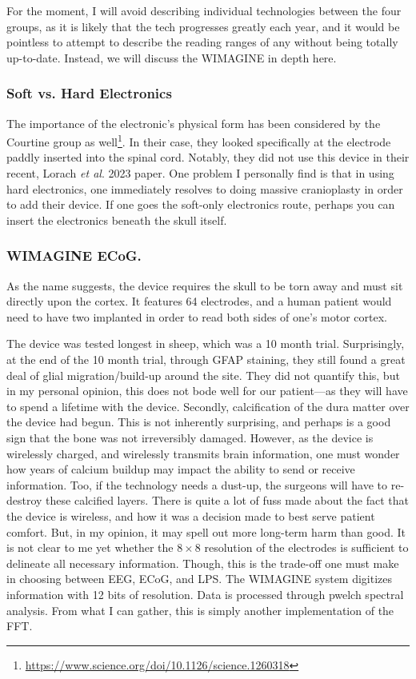 \documentclass[12pt]{report}
\begin{document}
For the moment, I will avoid describing individual technologies between the four groups, as it is likely that the tech progresses greatly each year, and it would be pointless to attempt to describe the reading ranges of any without being totally up-to-date. Instead, we will discuss the WIMAGINE in depth here.

\subsubsection{Soft vs. Hard Electronics}
The importance of the electronic's physical form has been considered by the Courtine group as well\footnote{\url{https://www.science.org/doi/10.1126/science.1260318}}. In their case, they looked specifically at the electrode paddly inserted into the spinal cord. Notably, they did not use this device in their recent, Lorach \textit{et al}. 2023 paper. One problem I personally find is that in using hard electronics, one immediately resolves to doing massive cranioplasty in order to add their device. If one goes the soft-only electronics route, perhaps you can insert the electronics beneath the skull itself. 

\subsubsection{WIMAGINE ECoG.}
As the name suggests, the device requires the skull to be torn away and must sit directly upon the cortex. It features 64 electrodes, and a human patient would need to have two implanted in order to read both sides of one's motor cortex.\newline

The device was tested longest in sheep, which was a 10 month trial. Surprisingly, at the end of the 10 month trial, through GFAP staining, they still found a great deal of glial migration/build-up around the site. They did not quantify this, but in my personal opinion, this does not bode well for our patient---as they will have to spend a lifetime with the device. Secondly, calcification of the dura matter over the device had begun. This is not inherently surprising, and perhaps is a good sign that the bone was not irreversibly damaged. However, as the device is wirelessly charged, and wirelessly transmits brain information, one must wonder how years of calcium buildup may impact the ability to send or receive information. Too, if the technology needs a dust-up, the surgeons will have to re-destroy these calcified layers. There is quite a lot of fuss made about the fact that the device is wireless, and how it was a decision made to best serve patient comfort. But, in my opinion, it may spell out more long-term harm than good. It is not clear to me yet whether the $8\times 8$ resolution of the electrodes is sufficient to delineate all necessary information. Though, this is the trade-off one must make in choosing between EEG, ECoG, and LPS. The WIMAGINE system digitizes information with 12 bits of resolution. Data is processed through pwelch spectral analysis. From what I can gather, this is simply another implementation of the FFT. 
\end{document}

